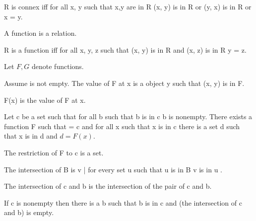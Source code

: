 \documentclass{article}
\begin{document}
\begin{forthel}
    \begin{definition}
      R is connex iff for all x, y such that x,y are in R
        (x, y) is in R or (y, x) is in R or x = y.
    \end{definition}

    \begin{signature}
      A function is a relation.
    \end{signature}

    \begin{axiom}[FunctionIntro]
      R is a function iff for all x, y, z such that (x, y) is in R and (x, z) is in R y = z.
    \end{axiom}

    Let $F, G$ denote functions.

    \begin{definition}
      Assume  is not empty.
      The value of F at x is a object y such that (x, y) is in F.
    \end{definition}

    \begin{definition}
      F(x) is the value of F at x.
    \end{definition}

    \begin{axiom}[Choice]
      Let c be a set such that for all b such that b is in c b is nonempty.
        There exists a function F such that  = c
        and for all x such that x is in c there is a set d such that x is in d and $d = F(x)$.
    \end{axiom}

    \begin{axiom}[Replacement]
      The restriction of F to c is a set.
    \end{axiom}

    \begin{definition}
      The intersection of B is { v | for every set u such that u is in B v is in u }.
    \end{definition}

    \begin{definition}
      The intersection of c and b is the intersection of the pair of c and b.
    \end{definition}

    \begin{axiom}[Restriction]
      If c is nonempty then there is a b such that b is in c and
        (the intersection of c and b) is empty.
    \end{axiom}
  \end{forthel}
\end{document}
